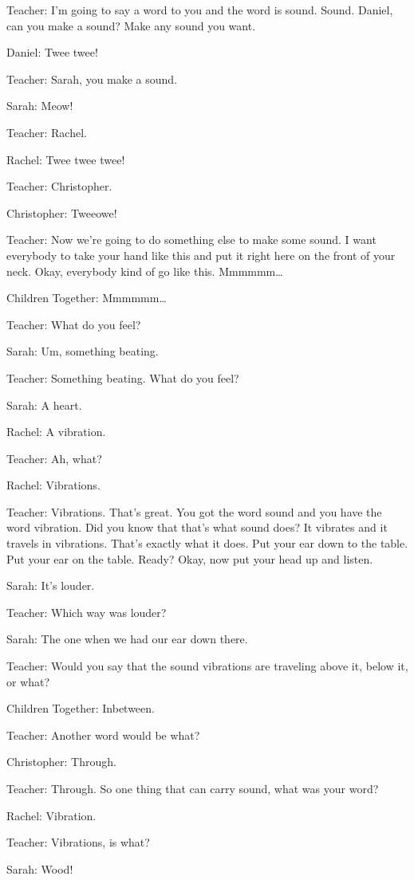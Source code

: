 Teacher: I'm going to say a word to you and the word is sound. Sound. Daniel, can you make a sound? Make any sound you want.

Daniel: Twee twee!

Teacher: Sarah, you make a sound.

Sarah: Meow!

Teacher: Rachel.

Rachel: Twee twee twee!

Teacher: Christopher.

Christopher: Tweeowe!

Teacher: Now we're going to do something else to make some sound. I want everybody to take your hand like this and put it right here on the front of your neck. Okay, everybody kind of go like this. Mmmmmm\dots

Children Together: Mmmmmm\dots

Teacher: What do you feel?

Sarah: Um, something beating.

Teacher: Something beating. What do you feel?

Sarah: A heart.

Rachel: A vibration.

Teacher: Ah, what?

Rachel: Vibrations.

Teacher: Vibrations. That's great. You got the word sound and you have the word vibration. Did you know that that's what sound does? It vibrates and it travels in vibrations. That's exactly what it does. Put your ear down to the table. Put your ear on the table. Ready? Okay, now put your head up and listen.

Sarah: It's louder.

Teacher: Which way was louder?

Sarah: The one when we had our ear down there.

Teacher: Would you say that the sound vibrations are traveling above it, below it, or what?

Children Together: Inbetween.

Teacher: Another word would be what?

Christopher: Through.

Teacher: Through. So one thing that can carry sound, what was your word?

Rachel: Vibration.

Teacher: Vibrations, is what?

Sarah: Wood!

